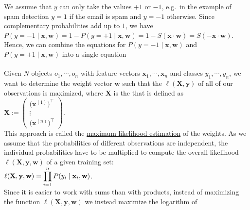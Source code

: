 We assume that $y$ can only take the values $+1$ or $-1$,  e.g.~in the example of spam detection $y = 1$ if the
email is spam and $y = -1$ otherwise.  Since complementary probabilities add up to $1$, we have
\\[0.2cm]
\hspace*{1.3cm}
$P(y=-1\;|\;\mathbf{x},\mathbf{w}) = 1 - P(y=+1\;|\;\mathbf{x},\mathbf{w}) 
  = 1 - S(\mathbf{x} \cdot \mathbf{w}) = S(-\mathbf{x} \cdot \mathbf{w})
$.
\\[0.2cm]
Hence, we can combine the equations for $P(y=-1\;|\;\mathbf{x},\mathbf{w})$ and $P(y=+1\;|\;\mathbf{x},\mathbf{w})$ into a
single equation
\\[0.2cm]
\hspace*{1.3cm}
\colorbox{red}{}
\\[0.2cm]
Given $N$ objects $o_1, \cdots, o_n $ with feature vectors $\mathbf{x}_1, \cdots, \mathbf{x}_n$ and classes
$y_1,\cdots,y_n$, we
want to determine the weight vector $\mathbf{w}$ such that the  $\ell(\mathbf{X}, \mathbf{y})$
 of all of our
observations is maximized, where $\mathbf{X}$ is the  that is defined as
\\[0.2cm]
\hspace*{1.3cm}
$\mathbf{X} := \left(
  \begin{array}{c}
    \bigl(\mathbf{x}^{(1)}\bigr)^\top  \\
    \vdots                         \\
    \bigl(\mathbf{x}^{(n)}\bigr)^\top
  \end{array}
  \right).   
$
\\[0.2cm]
This approach is called the 
\href{https://en.wikipedia.org/wiki/Maximum_likelihood_estimation}{maximum likelihood estimation}
 of the weights.
As we assume that the probabilities of different observations are independent, the individual
probabilities have to be multiplied to compute the overall likelihood $\ell(\mathbf{X}, \mathbf{y},\mathbf{w})$ 
of a given training set:
\\[0.2cm]
\hspace*{1.3cm}
$\displaystyle \ell(\mathbf{X},\mathbf{y},\mathbf{w}) = \prod\limits_{i=1}^n P(y_i \;|\;\mathbf{x}_i,\mathbf{w})$.
\\[0.2cm]
Since it is easier to work with sums than with products, instead of maximizing the function
$\ell(\mathbf{X},\mathbf{y},\mathbf{w})$ we instead maximize the logarithm of
